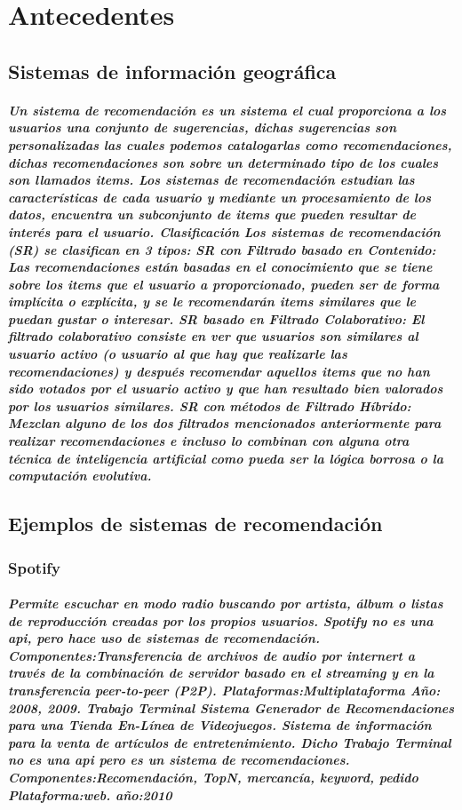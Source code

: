 \chapter {Antecedentes}
\section {Sistemas de información geográfica}
  \paragraph {Un sistema de recomendaci\'on es un sistema el cual proporciona a los usuarios una conjunto de sugerencias, dichas sugerencias son personalizadas las cuales podemos catalogarlas como recomendaciones, dichas recomendaciones son sobre un determinado tipo de los cuales son llamados items. Los sistemas de recomendaci\'on estudian las caracter\'isticas de cada usuario y mediante un procesamiento de los datos, encuentra un subconjunto de items que pueden resultar de inter\'es para el usuario. Clasificaci\'on Los sistemas de recomendaci\'on (SR) se clasifican en 3 tipos: SR con Filtrado basado en Contenido: Las recomendaciones est\'an basadas en el conocimiento que se tiene sobre los items que el usuario a proporcionado, pueden ser de forma impl\'icita o expl\'icita, y se le recomendar\'an items similares que le puedan gustar o interesar. SR basado en Filtrado Colaborativo: El filtrado colaborativo consiste en ver que usuarios son similares al usuario activo (o usuario al que hay que realizarle las recomendaciones) y despu\'es recomendar aquellos items que no han sido votados por el usuario activo y que han resultado bien valorados por los usuarios similares. SR con m\'etodos de Filtrado H\'ibrido: Mezclan alguno de los dos filtrados mencionados anteriormente para realizar recomendaciones e incluso lo combinan con alguna otra t\'ecnica de inteligencia artificial como pueda ser la l\'ogica borrosa o la computaci\'on evolutiva.}

\section {Ejemplos de sistemas de recomendación}
  \subsection {Spotify}
    \paragraph {Permite escuchar en modo radio buscando por artista, álbum o listas de reproducción creadas por los propios usuarios. Spotify no es una api, pero hace uso de sistemas de recomendación. Componentes:Transferencia de archivos de audio por internert a través de la combinación de servidor basado en el streaming y en la transferencia peer-to-peer (P2P). Plataformas:Multiplataforma Año: 2008, 2009. Trabajo Terminal Sistema Generador de Recomendaciones para una Tienda En-Línea de Videojuegos.\cite{5} Sistema de información para la venta de artículos de entretenimiento. Dicho Trabajo Terminal no es una api pero es un sistema de recomendaciones. Componentes:Recomendación, TopN, mercancía, keyword, pedido Plataforma:web. año:2010}

